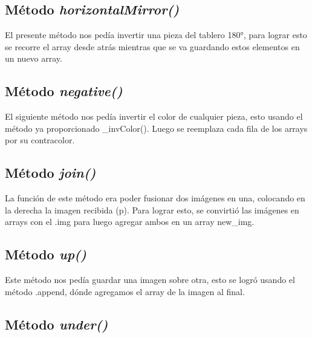 \documentclass{article}
\begin{document}
	\subsection{Método \textit{horizontalMirror()}}

El presente método nos pedía invertir una pieza del tablero 180°, para lograr esto se recorre el array desde atrás mientras que se va guardando estos elementos en un nuevo array.
	
		
		
	\subsection{Método \textit{negative()}}

El siguiente método nos pedía invertir el color de cualquier pieza, esto usando el método ya proporcionado \_invColor(). Luego se reemplaza cada fila de los arrays por su contracolor.
	
		

	\subsection{Método \textit{join()}}

La función de este método era poder fusionar dos imágenes en una, colocando en la derecha la imagen recibida (p). Para lograr esto,  se convirtió las imágenes en arrays con el .img para luego agregar ambos en un array new\_img.
	
		
		
	\subsection{Método \textit{up()}}

Este método nos pedía guardar una imagen sobre otra, esto se logró usando el método .append, dónde agregamos el array de la imagen al final.
	
		

	\subsection{Método \textit{under()}}
\end{document}
